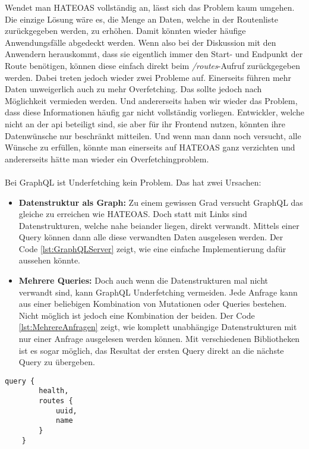 Wendet man \ac{HATEOAS} vollständig an, lässt sich das Problem kaum umgehen. Die einzige Lösung wäre es, die Menge an Daten, welche in der Routenliste zurückgegeben werden, zu erhöhen. Damit könnten wieder häufige Anwendungsfälle abgedeckt werden. Wenn also bei der Diskussion mit den Anwendern herauskommt, dass sie eigentlich immer den Start- und Endpunkt der Route benötigen, können diese einfach direkt beim \textit{/routes}-Aufruf zurückgegeben werden. Dabei treten jedoch wieder zwei Probleme auf. Einerseits führen mehr Daten unweigerlich auch zu mehr Overfetching. Das sollte jedoch nach Möglichkeit vermieden werden. Und andererseits haben wir wieder das Problem, dass diese Informationen häufig gar nicht vollständig vorliegen. Entwickler, welche nicht an der \ac{api} beteiligt sind, sie aber für ihr Frontend nutzen, könnten ihre Datenwünsche nur beschränkt mitteilen. Und wenn man dann noch versucht, alle Wünsche zu erfüllen, könnte man einerseits auf \ac{HATEOAS} ganz verzichten und andererseits hätte man wieder ein Overfetchingproblem.\\
\\
Bei GraphQL ist Underfetching kein Problem. Das hat zwei Ursachen:
\begin{itemize}
\item \textbf{Datenstruktur als Graph:} Zu einem gewissen Grad versucht GraphQL das gleiche zu erreichen wie \ac{HATEOAS}. Doch statt mit Links sind Datenstrukturen, welche nahe beiander liegen, direkt verwandt. Mittels einer Query können dann alle diese verwandten Daten ausgelesen werden. Der Code \ref{lst:GraphQLServer} zeigt, wie eine einfache Implementierung dafür aussehen könnte.
\item \textbf{Mehrere Queries:} Doch auch wenn die Datenstrukturen mal nicht verwandt sind, kann GraphQL Underfetching vermeiden. Jede Anfrage kann aus einer beliebigen Kombination von Mutationen oder Queries bestehen. Nicht möglich ist jedoch eine Kombination der beiden. Der Code \ref{lst:MehrereAnfragen} zeigt, wie komplett unabhängige Datenstrukturen mit nur einer Anfrage ausgelesen werden können. Mit verschiedenen Bibliotheken ist es sogar möglich, das Resultat der ersten Query direkt an die nächste Query zu übergeben.
\end{itemize}

\begin{lstlisting}[caption={Beispiel Anfrage mit mehreren Queries},captionpos=b,label=lst:MehrereAnfragen]
	query {
		health,
		routes { 
			uuid, 
			name 
		}
	}
\end{lstlisting}

